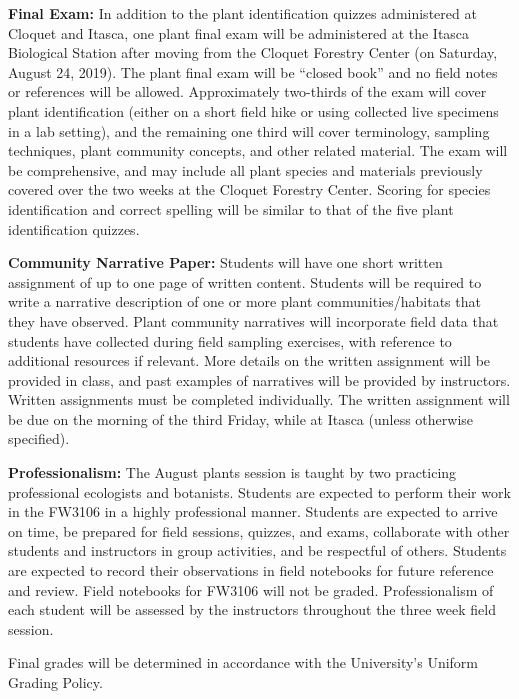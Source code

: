 \documentclass{tufte-handout}
\begin{document}
\begin{fullwidth}

\textbf{Final Exam:} In addition to the plant identification quizzes administered at Cloquet and Itasca, one plant final exam will be administered at the Itasca Biological Station after moving from the Cloquet Forestry Center (on Saturday, August 24, 2019). The plant final exam will be ``closed book'' and no field notes or references will be allowed. Approximately two-thirds of the exam will cover plant identification (either on a short field hike or using collected live specimens in a lab setting), and the remaining one third will cover terminology, sampling techniques, plant community concepts, and other related material. The exam will be comprehensive, and may include all plant species and materials previously covered over the two weeks at the Cloquet Forestry Center. Scoring for species identification and correct spelling will be similar to that of the five plant identification quizzes.

\textbf{Community Narrative Paper:} Students will have one short written assignment of up to one page of written content. Students will be required to write a narrative description of one or more plant communities/habitats that they have observed. Plant community narratives will incorporate field data that students have collected during field sampling exercises, with reference to additional resources if relevant. More details on the written assignment will be provided in class, and past examples of narratives will be provided by instructors. Written assignments must be completed individually. The written assignment will be due on the morning of the third Friday, while at Itasca (unless otherwise specified). 

\textbf{Professionalism:} The August plants session is taught by two practicing professional ecologists and botanists. Students are expected to perform their work in the FW3106 in a highly professional manner. Students are expected to arrive on time, be prepared for field sessions, quizzes, and exams, collaborate with other students and instructors in group activities, and be respectful of others. Students are expected to record their observations in field notebooks for future reference and review. Field notebooks for FW3106 will not be graded. Professionalism of each student will be assessed by the instructors throughout the three week field session. 


Final grades will be determined in accordance with the University’s Uniform Grading Policy.


\end{fullwidth}
\end{document}
